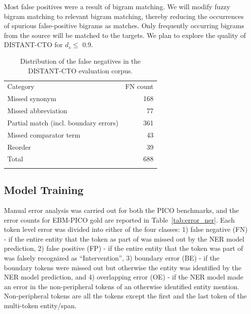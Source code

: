 \documentclass[11pt]{article}
\begin{document}
Most false positives were a result of bigram matching. 
We will modify fuzzy bigram matching to relevant bigram matching, thereby reducing the occurrences of spurious false-positive bigrams as matches.
Only frequently occurring bigrams from the source will be matched to the targets.
We plan to explore the quality of DISTANT-CTO for $d_s \leq$ 0.9.
%
\begin{table}[ht]
    \centering
    \begin{tabular}{l|r}
    \Xhline{1pt}
       Category & FN count  \\
    \Xhline{1pt}
       Missed synonym  & 168 \\
       Missed abbreviation & 77 \\
       Partial match (incl. boundary errors) & 361 \\
       Missed comparator term & 43 \\
       Reorder & 39 \\
       Total & 688 \\
    \Xhline{1pt}
    \end{tabular}
    \caption{Distribution of the false negatives in the DISTANT-CTO evaluation corpus.}
    \label{tab:error_candgen}
\end{table}
%
%
%
\subsection{Model Training}
\label{subsec:error_modeltrain}
%
Manual error analysis was carried out for both the PICO benchmarks, and the error counts for EBM-PICO gold are reported in Table~\ref{tab:error_ner}.
Each token level error was divided into either of the four classes: 1) false negative (FN) - if the entire entity that the token as part of was missed out by the NER model prediction, 2) false positive (FP) - if the entire entity that the token was part of was falsely recognized as ``Intervention'', 3) boundary error (BE) - if the boundary tokens were missed out but otherwise the entity was identified by the NER model prediction, and 4) overlapping error (OE) - if the NER model made an error in the non-peripheral tokens of an otherwise identified entity mention.
Non-peripheral tokens are all the tokens except the first and the last token of the multi-token entity/span.
\end{document}

